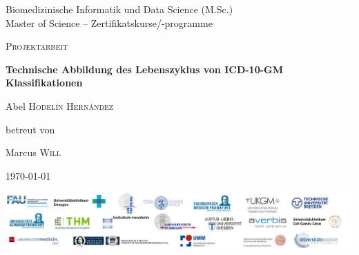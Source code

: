 \begin{titlepage}
		\thispagestyle{firstpage}
		\raggedright
		{\Large {\color{orange}Biomedizinische Informatik und Data Science (M.Sc.)\\}
			{\color{gray}Master of Science – Zertifikatskurse/-programme}
			\par}
		\vspace{1cm}
		\centering
		{\scshape\LARGE Projektarbeit\par}
		\vspace{1.5cm}
		{\huge \bfseries Technische Abbildung des Lebenszyklus von ICD-10-GM Klassifikationen\par}
		\vspace{2cm}
		{\Large Abel \textsc{Hodel\'in Hern\'andez}~\par}
		\vspace{2cm} 
		betreut von\par
		{Marcus \textsc{Will}\par}
		\vspace{2cm}				
		{\large \today\par}
		\vfill
		\includegraphics[width=\textwidth]{figures/onder_document.png}
	
	\end{titlepage}